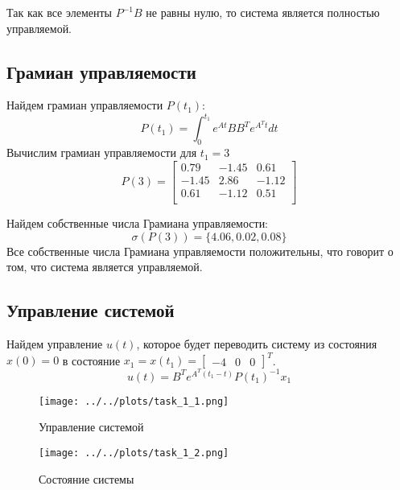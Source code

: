 Так как все элементы $P^{-1}B$ не равны нулю, то система является полностью управляемой.

\subsection{Грамиан управляемости}
Найдем грамиан управляемости $P(t_1)$:
\begin{equation}
    P(t_1) = \int_{0}^{t_1} e^{At}BB^Te^{A^Tt}dt
\end{equation}
Вычислим грамиан управляемости для $t_1 = 3$
\begin{equation}
    P(3) = \begin{bmatrix}
        0.79 & -1.45 & 0.61 \\ 
        -1.45 & 2.86 & -1.12 \\ 
        0.61 & -1.12 & 0.51 \\ 
    \end{bmatrix}
\end{equation}

Найдем собственные числа Грамиана управляемости: 
\begin{equation}
    \sigma(P(3)) = \{ 4.06, 0.02, 0.08 \}
\end{equation}
Все собственные числа Грамиана управляемости положительны, что говорит о том, что система является управляемой.


\subsection{Управление системой}
Найдем управление $u(t)$, которое будет переводить систему из состояния $x(0) = 0$ в состояние $x_1 = x(t_1) = \begin{bmatrix} -4 & 0 & 0 \end{bmatrix}^T$. 
\begin{equation}
    u(t) = B^Te^{A^T(t_1 - t)}P(t_1)^{-1}x_1
\end{equation}

\begin{figure}[H]
    \centering
    \texttt{[image: ../../plots/task\_1\_1.png]}
    \caption{Управление системой}
    \label{fig:task1_control_signal}
\end{figure}

\begin{figure}[H]
    \centering
    \texttt{[image: ../../plots/task\_1\_2.png]}
    \caption{Состояние системы}
    \label{fig:task1_state}
\end{figure}

